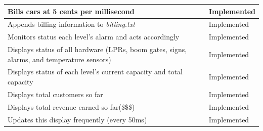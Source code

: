 \documentclass[a4paper]{article}
\begin{document}
\begin{tabular}{|m{24.7em}|l|}
  \hline
  Bills cars at 5 cents per millisecond & \cellcolor{green!40}Implemented\\
  \hline
  Appends billing information to \emph{billing.txt} & \cellcolor{green!40}Implemented\\
  \hline
  Monitors status each level’s alarm and acts accordingly & \cellcolor{green!40}Implemented\\
  \hline
  Displays status of all hardware (LPRs, boom gates, signs, alarms, and temperature sensors) & \cellcolor{green!40}Implemented\\
  \hline
  Displays status of each level’s current capacity and total capacity & \cellcolor{green!40}Implemented\\
  \hline
  Displays total customers so far & \cellcolor{green!40}Implemented\\
  \hline
  Displays total revenue earned so far(\$\$\$) & \cellcolor{green!40}Implemented\\
  \hline
  Updates this display frequently (every 50ms) & \cellcolor{green!40}Implemented\\
  \hline
\end{tabular}
\end{document}
